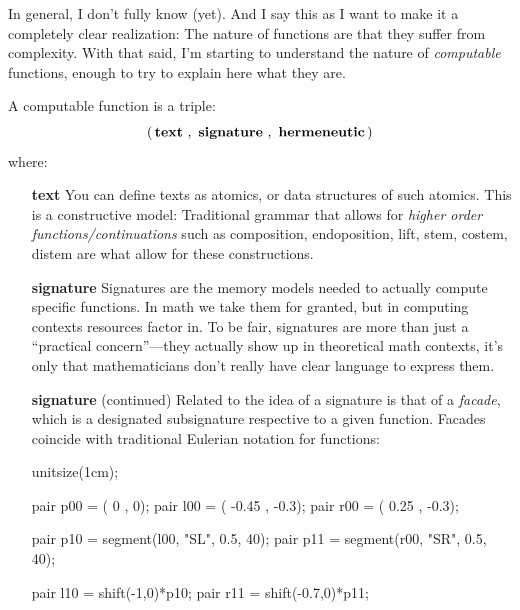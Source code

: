 \documentclass[twoside]{article}
\newcommand{\strong}[1]{{\bfseries #1}}
\newcommand{\bfmbox}[1]{\mbox{\bfseries #1}}
\begin{document}
\begin{minipage}{12cm}
In general, I don't fully know (yet). And I say this as I want to make it a completely clear realization:
The nature of functions are that they suffer from complexity. With that said, I'm starting to understand
the nature of \emph{computable} functions, enough to try to explain here what they are.

A computable function is a triple:
$$ (\,\bfmbox{text}\ ,\ \bfmbox{signature}\ ,\ \bfmbox{hermeneutic}\,) $$
where:
\begin{itemize}
\item[\strong{text}] You can define texts as atomics, or data structures of such atomics. This is a constructive
	model: Traditional grammar that allows for \emph{higher order functions/continuations} such as composition,
	endoposition, lift, stem, costem, distem are what allow for these constructions.
\item[\strong{signature}] Signatures are the memory models needed to actually compute specific functions.
	In math we take them for granted, but in computing contexts resources factor in. To be fair, signatures
	are more than just a ``practical concern''---they actually show up in theoretical math contexts,
	it's only that mathematicians don't really have clear language to express them.
\end{itemize}


\end{minipage}\newpage\begin{minipage}{12cm}


\begin{itemize}
\item [\strong{signature}] (continued) Related to the idea of a signature is that of a \emph{facade},
	which is a designated subsignature respective to a given function. Facades coincide with traditional
	Eulerian notation for functions:
	\begin{center}
	\begin{asy}
	unitsize(1cm);

	pair p00 = (    0  ,    0);
	pair l00 = ( -0.45 , -0.3);
	pair r00 = (  0.25 , -0.3);

	pair p10 = segment(l00, "SL", 0.5, 40);
	pair p11 = segment(r00, "SR", 0.5, 40);

	pair l10 = shift(-1,0)*p10;
	pair r11 = shift(-0.7,0)*p11;


\end{asy}
\end{center}
\end{itemize}
\end{minipage}
\end{document}

